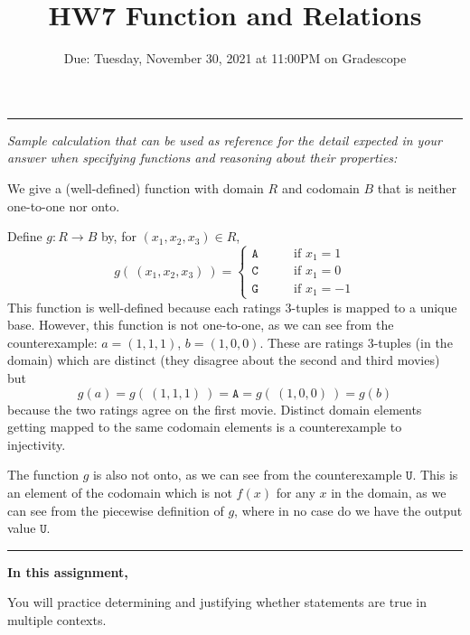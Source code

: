 \documentclass[12pt, oneside]{article}
\newcommand{\A}[0]{\texttt{A}}
\newcommand{\C}[0]{\texttt{C}}
\newcommand{\G}[0]{\texttt{G}}
\newcommand{\U}[0]{\texttt{U}}
\begin{document}
\begin{enumerate}
    \rule{0.5\textwidth}{.4pt}

    {\it Sample calculation that can be used as reference for the detail expected 
    in your answer when specifying functions and reasoning about their properties:} 
    
    We give a (well-defined) function with domain $R$ and codomain $B$ that is neither one-to-one nor onto.

    Define $g: R \to B$ by, for $(x_1, x_2,x_3) \in R$,
    \[
        g(~(x_1, x_2, x_3)~) = \begin{cases} 
            \A \qquad &\text{if $x_1 = 1$} \\
            \C \qquad &\text{if $x_1 = 0$} \\
            \G \qquad &\text{if $x_1 = -1$}
        \end{cases}
    \]
    This function is well-defined because each ratings $3$-tuples is mapped to a unique base.
    However, this function is not one-to-one, as we can see from the counterexample: 
    $a = (1,1,1)$, $b = (1, 0,0)$. These are ratings $3$-tuples (in the domain) which are 
    distinct (they disagree about the second and third movies) but
    \[
        g(a) = g(~(1,1,1)~) = \A = g(~(1,0,0)~) = g(b)
    \]
    because the two ratings agree on the first movie. Distinct domain 
    elements getting mapped to the same codomain elements is a counterexample to injectivity.

    The function $g$ is also not onto, as we can see from the counterexample $\U$. This is an 
    element of the codomain which is not $f(x)$ for any $x$ in the domain, as we can see 
    from the piecewise definition of $g$, where in no case do we have the output value $\U$.
    \rule{0.5\textwidth}{.4pt}


\end{enumerate}


    
\newpage

\title{HW7 Function and Relations}
\date{Due: Tuesday, November 30, 2021 at 11:00PM on Gradescope}


\maketitle
\thispagestyle{fancy}

{\bf In this assignment,}

You will practice determining and justifying whether 
statements are true in multiple contexts.
\end{document}
